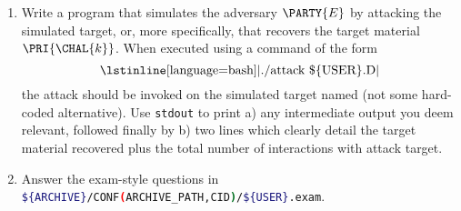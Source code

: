\documentclass[crop={false},multi={true},tikz={true}]{standalone}
\begin{document}
\begin{enumerate}
\item Write a program that simulates the adversary $\PARTY{E}$ by attacking
      the simulated target, or, more specifically, that recovers the target 
      material $\PRI{\CHAL{k}}$.  
      When executed using a command of the form
      \[
      \mbox{\lstinline[language={bash}]|./attack \$\{USER\}.D|}
      \]
      the attack should be invoked on the simulated target named (not some
      hard-coded alternative).  Use \lstinline[language={bash}]{stdout} to 
      print 
      a) any intermediate output you deem relevant, followed finally by 
      b) two lines which clearly detail the target material recovered plus
         the total number of interactions with attack target.
\item Answer the exam-style questions in 
      \lstinline[language={bash}]|${ARCHIVE}/CONF(ARCHIVE_PATH,CID)/${USER}.exam|.
\end{enumerate}


\ifstandalone
\printbibliography
\fi
\end{document}
